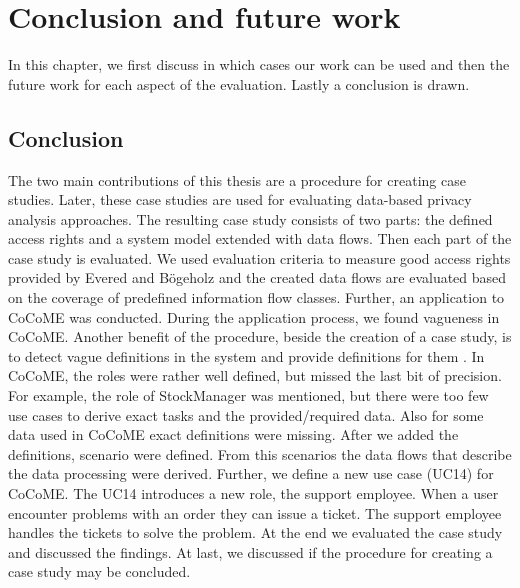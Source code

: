 
\chapter{Conclusion and future work}
\label{ch:Conclusion}
In this chapter, we first discuss in which cases our work can be used and then the future work for each aspect of the evaluation. Lastly a conclusion is drawn.



\section{Conclusion}
The two main contributions of this thesis are a procedure for creating case studies. Later, these case studies are used for evaluating data-based privacy analysis approaches. The resulting case study consists of two parts: the defined access rights and a system model extended with data flows. Then each part of the case study is evaluated. We used evaluation criteria to measure good access rights provided by Evered and Bögeholz \cite{CaseStudyAndAccessrigths} and the created data flows are evaluated based on the coverage of predefined information flow classes. Further, an application to CoCoME was conducted. During the application process, we found vagueness in CoCoME. Another benefit of the procedure, beside the creation of a case study, is to detect vague definitions in the system and provide definitions for them . In CoCoME, the roles were rather well defined, but missed the last bit of precision. For example, the role of StockManager was mentioned, but there were too few use cases to derive exact tasks and the provided/required data. Also for some data used in CoCoME exact definitions were missing. After we added the definitions, scenario were defined. From this scenarios the  data flows that describe the data processing were derived. Further, we define a new use case (UC14) for CoCoME. The UC14 introduces a new role, the support employee. When a user encounter problems with an order they can issue a ticket. The support employee handles the tickets to solve the problem. At the end we evaluated the case study and discussed the findings. At last, we discussed if the procedure for creating a case study may be concluded. 

